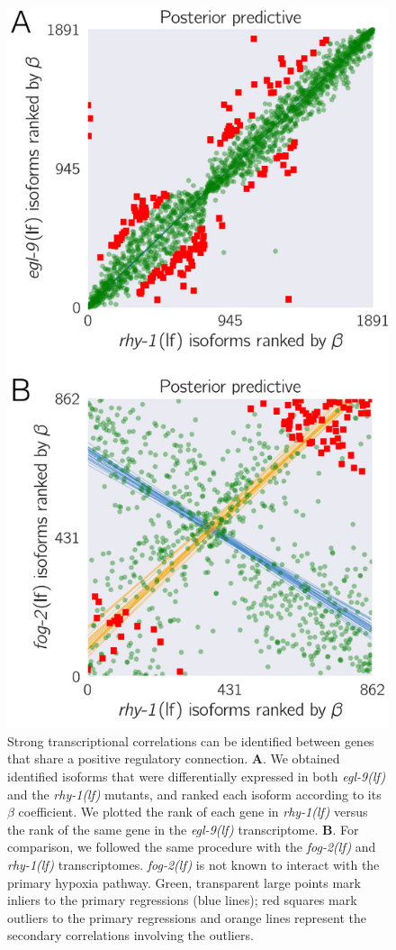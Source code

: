 \documentclass[9pt,twocolumn,twoside]{pnas-new}
\newcommand{\gene}[1]{\mbox{\emph{#1}}}
\newcommand{\fog}{\gene{fog-2(lf)}}
\newcommand{\egl}{\gene{egl-9(lf)}}
\newcommand{\rhy}{\gene{rhy-1(lf)}}
\begin{document}
\begin{figure}[tbhp]
  \centering
  \includegraphics[width=.4\textwidth]{../figs/positive_and_control.pdf}
  \caption{
    Strong transcriptional correlations can be identified between genes that
    share a positive regulatory connection.
    \textbf{A}. We obtained identified
    isoforms that were differentially expressed in both \egl{} and the \rhy{}
    mutants, and ranked each isoform according to its $\beta$ coefficient. We
    plotted the rank of each gene in \rhy{} versus the rank of the same gene in
    the \egl{} transcriptome.
    \textbf{B}. For comparison, we followed the same
    procedure with the \fog{} and \rhy{} transcriptomes. \fog{} is not known to
    interact with the primary hypoxia pathway.
    Green, transparent large points
    mark inliers to the primary regressions (blue lines); red squares mark
    outliers to the primary regressions and orange lines represent the secondary
    correlations involving the outliers.
  }
\label{fig:genetic_interactions}
\end{figure}
\end{document}
